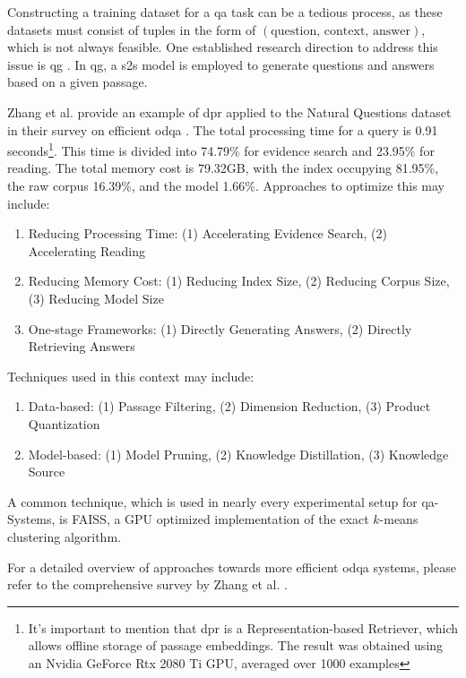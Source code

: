 Constructing a training dataset for a \gls{qa} task can be a tedious process, as these datasets must consist of tuples in the form of $(\text{question, context, answer})$, which is not always feasible. One established research direction to address this issue is \gls{qg} \cite{serban_generating_2016}. In \gls{qg}, a \gls{s2s} model is employed to generate questions and answers based on a given passage.

Zhang et al. provide an example of \gls{dpr} applied to the Natural Questions dataset in their survey on efficient \gls{odqa} \cite{zhang_survey_2023}. The total processing time for a query is 0.91 seconds\footnote{It's important to mention that \gls{dpr} is a Representation-based Retriever, which allows offline storage of passage embeddings. The result was obtained using an Nvidia GeForce Rtx 2080 Ti GPU, averaged over 1000 examples}. This time is divided into 74.79\% for evidence search and 23.95\% for reading. The total memory cost is 79.32GB, with the index occupying 81.95\%, the raw corpus 16.39\%, and the model 1.66\%. Approaches to optimize this may include:

\begin{enumerate}
    \item Reducing Processing Time: (1) Accelerating Evidence Search, (2) Accelerating Reading
    \item Reducing Memory Cost: (1) Reducing Index Size, (2) Reducing Corpus Size, (3) Reducing Model Size
    \item One-stage Frameworks: (1) Directly Generating Answers, (2) Directly Retrieving Answers
\end{enumerate}

Techniques used in this context may include:

\begin{enumerate}
    \item Data-based: (1) Passage Filtering, (2) Dimension Reduction, (3) Product Quantization
    \item Model-based: (1) Model Pruning, (2) Knowledge Distillation, (3) Knowledge Source 
\end{enumerate}

A common technique, which is used in nearly every experimental setup for \gls{qa}-Systems, is FAISS\cite{johnson_billion-scale_2017}, a GPU optimized implementation of the exact $k$-means clustering algorithm.

For a detailed overview of approaches towards more efficient \gls{odqa} systems, please refer to the comprehensive survey by Zhang et al. \cite{zhang_survey_2023}.

